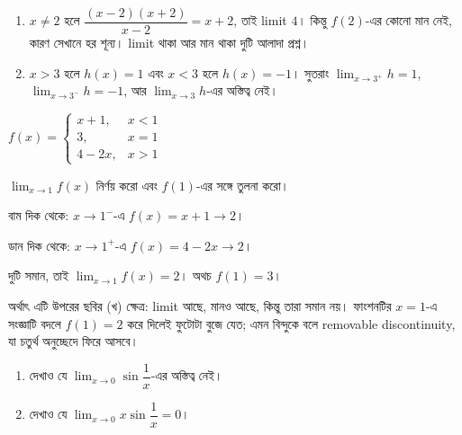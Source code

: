\documentclass[11pt]{article}
\begin{document}
\begin{sol}
\begin{enumerate}
  \item $x \neq 2$ হলে $\dfrac{(x-2)(x+2)}{x-2} = x+2$, তাই limit $4$।
        কিন্তু $f(2)$-এর কোনো মান নেই, কারণ সেখানে হর শূন্য। limit থাকা আর
        মান থাকা দুটি আলাদা প্রশ্ন।
  \item $x > 3$ হলে $h(x) = 1$ এবং $x < 3$ হলে $h(x) = -1$। সুতরাং
        $\lim_{x \to 3^{+}} h = 1$, $\lim_{x \to 3^{-}} h = -1$, আর
        $\lim_{x \to 3} h$-এর অস্তিত্ব নেই।
\end{enumerate}
\end{sol}

 $f(x) = \begin{cases} x+1, & x < 1 \\ 3, & x = 1 \\ 4-2x, & x > 1
\end{cases}$

$\lim_{x \to 1} f(x)$ নির্ণয় করো এবং $f(1)$-এর সঙ্গে তুলনা করো।

\begin{sol}
বাম দিক থেকে: $x \to 1^{-}$-এ $f(x) = x+1 \to 2$।

ডান দিক থেকে: $x \to 1^{+}$-এ $f(x) = 4-2x \to 2$।

দুটি সমান, তাই $\lim_{x \to 1} f(x) = 2$। অথচ $f(1) = 3$।

অর্থাৎ এটি উপরের ছবির (খ) ক্ষেত্র: limit আছে, মানও আছে, কিন্তু তারা সমান নয়।
ফাংশনটির $x = 1$-এ সংজ্ঞাটি বদলে $f(1) = 2$ করে দিলেই ফুটোটা বুজে যেত; এমন
বিন্দুকে বলে removable discontinuity, যা চতুর্থ অনুচ্ছেদে ফিরে আসবে।
\end{sol}

 \begin{enumerate}
  \item দেখাও যে $\lim_{x \to 0} \sin\dfrac{1}{x}$-এর অস্তিত্ব নেই।
  \item দেখাও যে $\lim_{x \to 0} x\sin\dfrac{1}{x} = 0$।
\end{enumerate}
\end{document}
